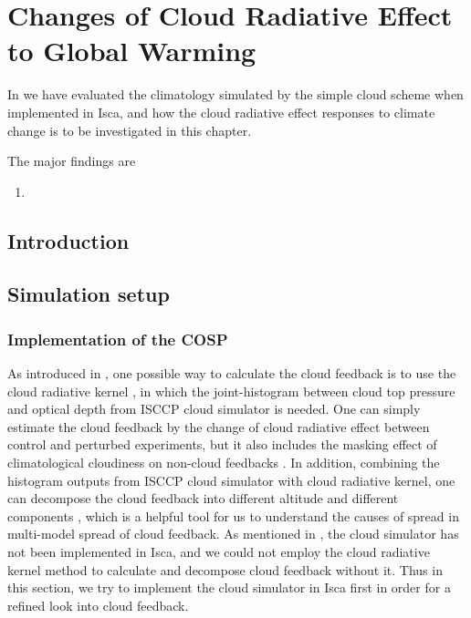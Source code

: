 \chapter{Changes of Cloud Radiative Effect to Global Warming}

In  we have evaluated the climatology simulated by the simple cloud scheme when implemented in Isca, and how the cloud radiative effect responses to climate change is to be investigated in this chapter. 

The major findings are
\begin{enumerate}
    \item 
\end{enumerate}

\section{Introduction}


\section{Simulation setup}

\subsection{Implementation of the COSP}
As introduced in , one possible way to calculate the cloud feedback is to use the cloud radiative kernel \citep{Zelinka2012computing1,Zelinka2012computing2}, in which the joint-histogram between cloud top pressure and optical depth from ISCCP cloud simulator is needed. One can simply estimate the cloud feedback by the change of cloud radiative effect between control and perturbed experiments, but it also includes the masking effect of climatological cloudiness on non-cloud feedbacks \citep{Soden2004}. In addition, combining the histogram outputs from ISCCP cloud simulator with cloud radiative kernel, one can decompose the cloud feedback into  different altitude and different components \citep{Zelinka2012computing2,Zelinka2016insights}, which is a helpful tool for us to understand the causes of spread in multi-model spread of cloud feedback. As mentioned in , the cloud simulator has not been implemented in Isca, and we could not employ the cloud radiative kernel method to calculate and decompose cloud feedback without it. Thus in this section, we try to implement the cloud simulator in Isca first in order for a refined look into cloud feedback.

